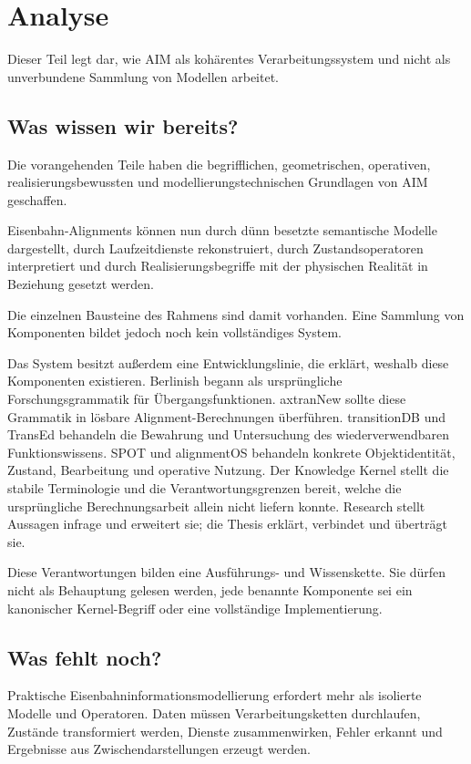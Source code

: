\chapter*{Analyse}
{}

Dieser Teil legt dar, wie AIM als kohärentes Verarbeitungssystem und nicht als
unverbundene Sammlung von Modellen arbeitet.

\section*{Was wissen wir bereits?}
Die vorangehenden Teile haben die begrifflichen, geometrischen, operativen,
realisierungsbewussten und modellierungstechnischen Grundlagen von AIM
geschaffen.

Eisenbahn-Alignments können nun durch dünn besetzte semantische Modelle
dargestellt, durch Laufzeitdienste rekonstruiert, durch Zustandsoperatoren
interpretiert und durch Realisierungsbegriffe mit der physischen Realität in
Beziehung gesetzt werden.

Die einzelnen Bausteine des Rahmens sind damit vorhanden. Eine Sammlung von
Komponenten bildet jedoch noch kein vollständiges System.

Das System besitzt außerdem eine Entwicklungslinie, die erklärt, weshalb diese
Komponenten existieren. Berlinish begann als ursprüngliche Forschungsgrammatik
für Übergangsfunktionen. axtranNew sollte diese Grammatik in lösbare
Alignment-Berechnungen überführen. transitionDB und TransEd behandeln die
Bewahrung und Untersuchung des wiederverwendbaren Funktionswissens. SPOT und
alignmentOS behandeln konkrete Objektidentität, Zustand, Bearbeitung und
operative Nutzung. Der Knowledge Kernel stellt die stabile Terminologie und
die Verantwortungsgrenzen bereit, welche die ursprüngliche Berechnungsarbeit
allein nicht liefern konnte. Research stellt Aussagen infrage und erweitert
sie; die Thesis erklärt, verbindet und überträgt sie.

Diese Verantwortungen bilden eine Ausführungs- und Wissenskette. Sie dürfen
nicht als Behauptung gelesen werden, jede benannte Komponente sei ein
kanonischer Kernel-Begriff oder eine vollständige Implementierung.

\section*{Was fehlt noch?}
Praktische Eisenbahninformationsmodellierung erfordert mehr als isolierte
Modelle und Operatoren. Daten müssen Verarbeitungsketten durchlaufen, Zustände
transformiert werden, Dienste zusammenwirken, Fehler erkannt und Ergebnisse
aus Zwischendarstellungen erzeugt werden.

